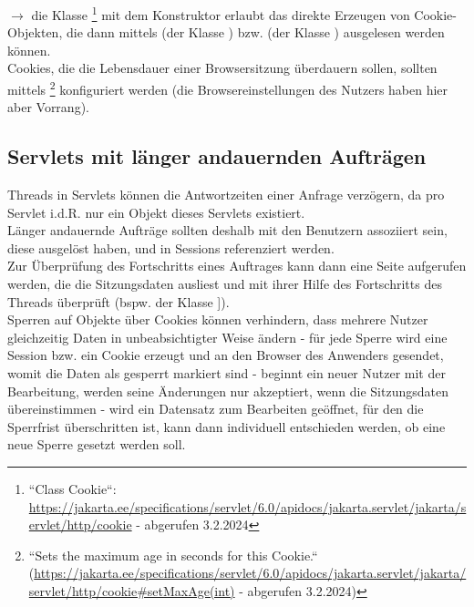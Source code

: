 \noindent
$\rightarrow$ die Klasse \footnote{
``Class Cookie``: \url{https://jakarta.ee/specifications/servlet/6.0/apidocs/jakarta.servlet/jakarta/servlet/http/cookie} - abgerufen 3.2.2024
} mit dem Konstruktor  erlaubt das direkte Erzeugen von Cookie-Objekten, die dann mittels  (der Klasse ) bzw.  (der Klasse ) ausgelesen werden können.\\

\noindent
Cookies, die die Lebensdauer einer Browsersitzung überdauern sollen, sollten mittels \footnote{
    ``Sets the maximum age in seconds for this Cookie.`` (\url{https://jakarta.ee/specifications/servlet/6.0/apidocs/jakarta.servlet/jakarta/servlet/http/cookie#setMaxAge(int)} - abgerufen 3.2.2024)
} konfiguriert werden (die Browsereinstellungen des Nutzers haben hier aber Vorrang).

\subsection{Servlets mit länger andauernden Aufträgen}
Threads in Servlets können die Antwortzeiten einer Anfrage verzögern, da pro Servlet i.d.R. nur ein Objekt dieses Servlets existiert.\\

\noindent
Länger andauernde Aufträge sollten deshalb mit den Benutzern assoziiert sein, diese ausgelöst haben, und in Sessions referenziert werden.\\

\noindent
Zur Überprüfung des Fortschritts eines Auftrages kann dann eine Seite aufgerufen werden, die die Sitzungsdaten ausliest und mit ihrer Hilfe des Fortschritts des Threads überprüft (bspw.  der Klasse ]).\\

\noindent
Sperren auf Objekte über Cookies können verhindern, dass mehrere Nutzer gleichzeitig Daten in unbeabsichtigter Weise ändern - für jede Sperre wird eine Session {bzw.} ein Cookie erzeugt und an den Browser des Anwenders gesendet, womit die Daten als gesperrt markiert sind - beginnt ein neuer Nutzer mit der Bearbeitung, werden seine Änderungen nur akzeptiert, wenn die Sitzungsdaten übereinstimmen - wird ein Datensatz zum Bearbeiten geöffnet, für den die Sperrfrist überschritten ist, kann dann individuell entschieden werden, ob eine neue Sperre gesetzt werden soll.\\


